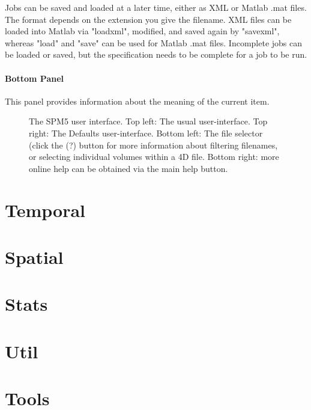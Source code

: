 \documentclass[a4paper,titlepage]{book}
\begin{document}
Jobs can be saved and loaded at a later time, either as XML or Matlab .mat files.  The format depends on the extension you give the filename. XML files can be loaded into Matlab via "loadxml", modified, and saved again by "savexml", whereas "load" and "save" can be used for Matlab .mat files. Incomplete jobs can be loaded or saved, but the specification needs to be complete for a job to be run.




\subsection*{Bottom Panel}

This panel provides information about the meaning of the current item.

\begin{figure} \begin{center}    \end{center} \caption{The SPM5 user interface. Top left: The usual user-interface.  Top right: The Defaults user-interface. Bottom left: The file selector (click the (?) button for more information about filtering filenames, or selecting individual volumes within a 4D file. Bottom right: more online help can be obtained via the main help button.} \end{figure} 

\part{Temporal}


\part{Spatial}






\part{Stats}



\part{Util}











\part{Tools}



\parskip=0mm

\end{document}
